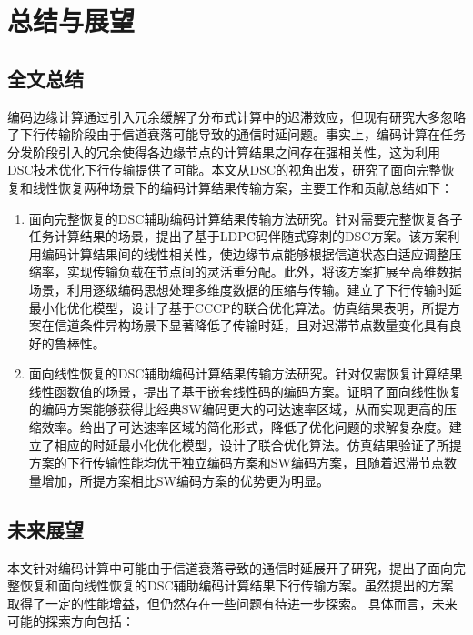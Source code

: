 \chapter{总结与展望}

\section{全文总结}

编码边缘计算通过引入冗余缓解了分布式计算中的迟滞效应，但现有研究大多忽略了下行传输阶段由于信道衰落可能导致的通信时延问题。事实上，编码计算在任务分发阶段引入的冗余使得各边缘节点的计算结果之间存在强相关性，这为利用DSC技术优化下行传输提供了可能。本文从DSC的视角出发，研究了面向完整恢复和线性恢复两种场景下的编码计算结果传输方案，主要工作和贡献总结如下：

\begin{enumerate}[label=（\arabic*）]
	\item 面向完整恢复的DSC辅助编码计算结果传输方法研究。针对需要完整恢复各子任务计算结果的场景，提出了基于LDPC码伴随式穿刺的DSC方案。该方案利用编码计算结果间的线性相关性，使边缘节点能够根据信道状态自适应调整压缩率，实现传输负载在节点间的灵活重分配。此外，将该方案扩展至高维数据场景，利用逐级编码思想处理多维度数据的压缩与传输。建立了下行传输时延最小化优化模型，设计了基于CCCP的联合优化算法。仿真结果表明，所提方案在信道条件异构场景下显著降低了传输时延，且对迟滞节点数量变化具有良好的鲁棒性。

	\item 面向线性恢复的DSC辅助编码计算结果传输方法研究。针对仅需恢复计算结果线性函数值的场景，提出了基于嵌套线性码的编码方案。证明了面向线性恢复的编码方案能够获得比经典SW编码更大的可达速率区域，从而实现更高的压缩效率。给出了可达速率区域的简化形式，降低了优化问题的求解复杂度。建立了相应的时延最小化优化模型，设计了联合优化算法。仿真结果验证了所提方案的下行传输性能均优于独立编码方案和SW编码方案，且随着迟滞节点数量增加，所提方案相比SW编码方案的优势更为明显。
\end{enumerate}


\section{未来展望}

本文针对编码计算中可能由于信道衰落导致的通信时延展开了研究，提出了面向完整恢复和面向线性恢复的DSC辅助编码计算结果下行传输方案。虽然提出的方案取得了一定的性能增益，但仍然存在一些问题有待进一步探索。
具体而言，未来可能的探索方向包括：

